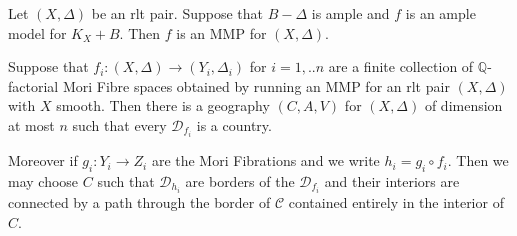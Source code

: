 \documentclass[a4paper,12pt]{amsart}
\begin{document}
	\begin{lemma}\cite[Lemma 3.6]{hacon2009sarkisov}\label{amp}
		Let $(X,\Delta)$ be an rlt pair. Suppose that $B-\Delta$ is ample and $f$ is an ample model for $K_{X}+B$. Then $f$ is an MMP for $(X,\Delta)$.
	\end{lemma}
\begin{lemma}\label{geo}
	Suppose that $f_{i}: (X,\Delta) \to (Y_{i},\Delta_{i})$ for $i=1,..n$ are a finite collection of $\mathbb{Q}$-factorial Mori Fibre spaces obtained by running an MMP for an rlt pair $(X,\Delta)$ with $X$ smooth. Then there is a geography $(C,A,V)$ for $(X,\Delta)$ of dimension at most $n$ such that every $\mathcal{D}_{f_{i}}$ is a country. 
	
	Moreover if $g_{i}:Y_{i}\to Z_{i}$ are the Mori Fibrations and we write $h_{i}=g_{i}\circ f_{i}$. Then we may choose $C$ such that $\mathcal{D}_{h_{i}}$ are borders of the $\mathcal{D}_{f_{i}}$ and their interiors are connected by a path through the border of $\mathcal{C}$ contained entirely in the interior of $C$.
\end{lemma}
\end{document}
